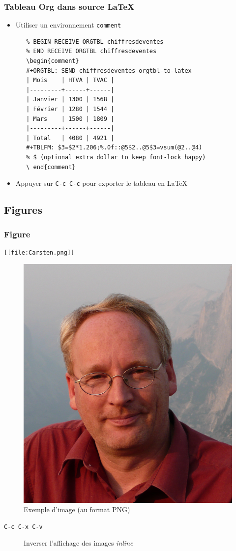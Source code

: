 \documentclass[presentation,t,hideothersubsections]{beamer}
\begin{document}
\begin{frame}[fragile]
\frametitle{Tableau Org dans source \LaTeX{}}
\label{sec-3-3-15}


\begin{itemize}
\item Utiliser un environnement \texttt{comment}


\lstset{language=TeX}
\begin{lstlisting}
   % BEGIN RECEIVE ORGTBL chiffresdeventes
   % END RECEIVE ORGTBL chiffresdeventes
   \begin{comment}
   #+ORGTBL: SEND chiffresdeventes orgtbl-to-latex
   | Mois    | HTVA | TVAC |
   |---------+------+------|
   | Janvier | 1300 | 1568 |
   | Février | 1280 | 1544 |
   | Mars    | 1500 | 1809 |
   |---------+------+------|
   | Total   | 4080 | 4921 |
   #+TBLFM: $3=$2*1.206;%.0f::@5$2..@5$3=vsum(@2..@4)
   % $ (optional extra dollar to keep font-lock happy)
   \ end{comment}
\end{lstlisting}
\item Appuyer sur \texttt{C-c C-c} pour exporter le tableau en \LaTeX{}
\end{itemize}
\end{frame}
\subsection{Figures}
\label{sec-3-4}
\begin{frame}[fragile]
\frametitle{Figure}
\label{sec-3-4-1}



\lstset{language=org}
\begin{lstlisting}
[[file:Carsten.png]]
\end{lstlisting}

\begin{figure}[!htbp]
\centering
\includegraphics[width=.25\linewidth]{Carsten.png}
\caption{Exemple d'image (au format PNG)}
\end{figure}

\begin{description}
\item[\texttt{C-c C-x C-v}] Inverser l'affichage des images \emph{inline}
\end{description}
\end{frame}
\end{document}
